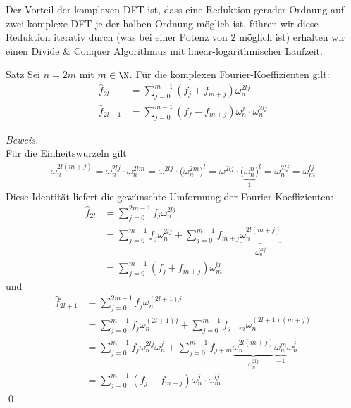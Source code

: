 Der Vorteil der komplexen DFT ist, dass eine Reduktion gerader Ordnung auf zwei komplexe DFT je der halben
Ordnung möglich ist, führen wir diese Reduktion iterativ durch (was bei einer Potenz von $2$ möglich ist) 
erhalten wir einen Divide \& Conquer Algorithmus mit linear-logarithmischer Laufzeit.

\begin{colbox}{Satz}
  Sei $n=2m$ mit $m\in\N$. Für die komplexen Fourier-Koeffizienten gilt:
  \begin{align*}
    \hat{f}_{2l} &= \sum_{j=0}^{m-1} (f_j+f_{m+j})\omega_n^{2lj} \\
    \hat{f}_{2l+1} &= \sum_{j=0}^{m-1} (f_f-f_{m+j})\omega_n^{j}\cdot\omega_n^{2lj}
  \end{align*}
\end{colbox}

\textit{Beweis.} \\
Für die Einheitswurzeln gilt 
%
\begin{align*}
  \omega_n^{2l(m+j)} 
  = \omega_n^{2lj}\cdot \omega_n^{2lm} 
  = \omega^{2lj}\cdot \big(\omega_n^{2m}\big)^l
  = \omega^{2lj}\cdot \big(\underbrace{\omega_n^n}_{1}\big)^l
  = \omega_n^{2lj} = \omega_m^{lj}
\end{align*}
%
Diese Identität liefert die gewünschte Umformung der Fourier-Koeffizienten:
%
\begin{align*}
  \hat{f}_{2l} 
  &= \sum_{j=0}^{2m-1}f_j\omega_n^{2lj} \\
  &= \sum_{j=0}^{m-1} f_j\omega_n^{2lj} + \sum_{j=0}^{m-1} f_{m+j}\underbrace{\omega_n^{2l(m+j)}}_{\omega_n^{2lj}} \\
  &= \sum_{j=0}^{m-1} (f_j+f_{m+j})\omega_m^{lj}
\end{align*}
und 
\begin{align*}
  \hat{f}_{2l+1} &= \sum_{j=0}^{2m-1} f_j\omega_n^{(2l+1)j} \\
  &= \sum_{j=0}^{m-1}f_j\omega_n^{(2l+1)j} + \sum_{j=0}^{m-1} f_{j+m}\omega_n^{(2l+1)(m+j)}\\
  &= \sum_{j=0}^{m-1}f_j\omega_n^{2lj}\omega_n^j + \sum_{j=0}^{m-1} f_{j+m}
  \underbrace{\omega_n^{2l(m+j)}}_{\omega_n^{2lj}}
  \underbrace{\omega_n^{m}}_{-1}\omega_n^{j}\\
  &= \sum_{j=0}^{m-1}(f_j-f_{m+j})\omega_n^{j}\cdot\omega_m^{lj}
\end{align*}
%
\qed

